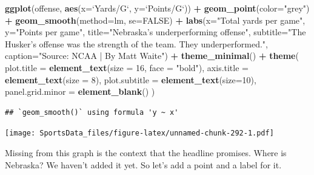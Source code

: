 \documentclass[
]{book}
\newenvironment{Shaded}{\begin{snugshade}}{\end{snugshade}}
\newcommand{\DataTypeTok}[1]{\textcolor[rgb]{0.13,0.29,0.53}{#1}}
\newcommand{\DecValTok}[1]{\textcolor[rgb]{0.00,0.00,0.81}{#1}}
\newcommand{\KeywordTok}[1]{\textcolor[rgb]{0.13,0.29,0.53}{\textbf{#1}}}
\newcommand{\NormalTok}[1]{#1}
\newcommand{\OperatorTok}[1]{\textcolor[rgb]{0.81,0.36,0.00}{\textbf{#1}}}
\newcommand{\OtherTok}[1]{\textcolor[rgb]{0.56,0.35,0.01}{#1}}
\newcommand{\StringTok}[1]{\textcolor[rgb]{0.31,0.60,0.02}{#1}}
\begin{document}
\begin{Shaded}
\begin{Highlighting}[]
\KeywordTok{ggplot}\NormalTok{(offense, }\KeywordTok{aes}\NormalTok{(}\DataTypeTok{x=}\StringTok{`}\DataTypeTok{Yards/G}\StringTok{`}\NormalTok{, }\DataTypeTok{y=}\StringTok{`}\DataTypeTok{Points/G}\StringTok{`}\NormalTok{)) }\OperatorTok{+}\StringTok{ }
\StringTok{  }\KeywordTok{geom_point}\NormalTok{(}\DataTypeTok{color=}\StringTok{"grey"}\NormalTok{) }\OperatorTok{+}\StringTok{ }\KeywordTok{geom_smooth}\NormalTok{(}\DataTypeTok{method=}\NormalTok{lm, }\DataTypeTok{se=}\OtherTok{FALSE}\NormalTok{) }\OperatorTok{+}\StringTok{ }
\StringTok{  }\KeywordTok{labs}\NormalTok{(}\DataTypeTok{x=}\StringTok{"Total yards per game"}\NormalTok{, }\DataTypeTok{y=}\StringTok{"Points per game"}\NormalTok{, }\DataTypeTok{title=}\StringTok{"Nebraska's underperforming offense"}\NormalTok{, }\DataTypeTok{subtitle=}\StringTok{"The Husker's offense was the strength of the team. They underperformed."}\NormalTok{, }\DataTypeTok{caption=}\StringTok{"Source: NCAA | By Matt Waite"}\NormalTok{) }\OperatorTok{+}\StringTok{ }
\StringTok{  }\KeywordTok{theme_minimal}\NormalTok{() }\OperatorTok{+}\StringTok{ }
\StringTok{  }\KeywordTok{theme}\NormalTok{(}
    \DataTypeTok{plot.title =} \KeywordTok{element_text}\NormalTok{(}\DataTypeTok{size =} \DecValTok{16}\NormalTok{, }\DataTypeTok{face =} \StringTok{"bold"}\NormalTok{),}
    \DataTypeTok{axis.title =} \KeywordTok{element_text}\NormalTok{(}\DataTypeTok{size =} \DecValTok{8}\NormalTok{), }
    \DataTypeTok{plot.subtitle =} \KeywordTok{element_text}\NormalTok{(}\DataTypeTok{size=}\DecValTok{10}\NormalTok{), }
    \DataTypeTok{panel.grid.minor =} \KeywordTok{element_blank}\NormalTok{()}
\NormalTok{    ) }
\end{Highlighting}
\end{Shaded}

\begin{verbatim}
## `geom_smooth()` using formula 'y ~ x'
\end{verbatim}

\texttt{[image: SportsData\_files/figure-latex/unnamed-chunk-292-1.pdf]}

Missing from this graph is the context that the headline promises. Where is Nebraska? We haven't added it yet. So let's add a point and a label for it.
\end{document}
